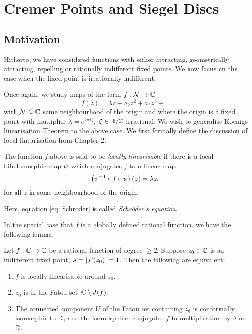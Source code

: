 \documentclass[../main.tex]{subfiles}
\begin{document}
\section{Cremer Points and Siegel Discs}
\label{sec:11}

\subsection{Motivation}

Hitherto, we have considered functions with either attracting, geometrically attracting, repelling or rationally indifferent fixed points. We now focus on the case when the fixed point is irrationally indifferent.

Once again, we study maps of the form $f : \mathcal{N} \to \mathbb{C}$
\begin{equation}\label{eq: def f}
    f(z) = \lambda z + a_2 z^2 + a_3 z^3 + \dots
\end{equation}
with $\mathcal{N} \subseteq \mathbb{C}$ some neighbourhood of the origin and where the origin is a fixed point with multiplier $\lambda  = e^{2\pi i \xi},$ $\xi \in \mathbb{R}/\mathbb{Z}$ irrational. We wish to generalise Koenigs linearisation Theorem to the above case. We first formally define the discussion of local linearisation from Chapter 2. 

\begin{dfn} The function $f$ above is said to be \emph{locally linearisable} if there is a local biholomorphic map $\psi$ which conjugates $f$ to a linear map:
\begin{equation}\label{eq: Schroder}
    \left(\psi^{-1} \circ f \circ \psi\right)(z) = \lambda z, \;
\end{equation}
for all $z$ in some neighbourhood of the origin.
\end{dfn}

Here, equation \eqref{eq: Schroder} is called \textit{Schr\"oder's equation}. 

In the special case that $f$ is a globally defined rational function, we have the following lemma:

\begin{lem}\label{lem:11.1}
Let $f : \mathbb{C} \to \mathbb{C}$ be a rational function of degree $\geq 2$. Suppose $z_0 \in \mathbb{C}$ is an indifferent fixed point, $\lambda = \left|f'(z_0)\right| = 1$. Then the following are equivalent:
\begin{enumerate}
	\item $f$ is locally linearisable around $z_0$.
	\item $z_0$ is in the Fatou set $\, \mathbb{C} \setminus J(f)$.
	\item The connected component $U$ of the Fatou set containing $z_0$ is conformally isomorphic to $\mathbb{D}$, and the isomorphism conjugates $f$ to multiplication by $\lambda$ on $\mathbb{D}$.
\end{enumerate}
\end{lem}
\end{document}
